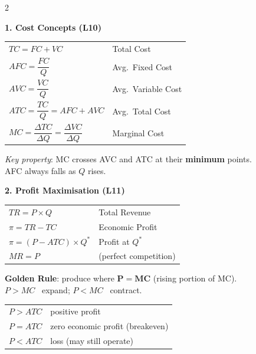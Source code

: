 \documentclass[9pt]{article}
\begin{document}
\begin{multicols}{2}

\begin{bluebox}
\textbf{\color{micro_blue}1. Cost Concepts (L10)}

\smallskip
\begin{tabular}{@{}ll@{}}
$TC = FC + VC$ & Total Cost \\[2pt]
$AFC = \dfrac{FC}{Q}$ & Avg.\ Fixed Cost \\[6pt]
$AVC = \dfrac{VC}{Q}$ & Avg.\ Variable Cost \\[6pt]
$ATC = \dfrac{TC}{Q} = AFC + AVC$ & Avg.\ Total Cost \\[6pt]
$MC = \dfrac{\Delta TC}{\Delta Q} = \dfrac{\Delta VC}{\Delta Q}$ & Marginal Cost \\[4pt]
\end{tabular}

\smallskip
\textit{Key property}: MC crosses AVC and ATC at their \textbf{minimum} points.\\
AFC always falls as $Q$ rises.
\end{bluebox}

\begin{bluebox}
\textbf{\color{micro_blue}2. Profit Maximisation (L11)}

\smallskip
\begin{tabular}{@{}ll@{}}
$TR = P \times Q$ & Total Revenue \\[3pt]
$\pi = TR - TC$ & Economic Profit \\[3pt]
$\pi = (P - ATC) \times Q^*$ & Profit at $Q^*$ \\[3pt]
$MR = P$ & (perfect competition) \\[3pt]
\end{tabular}

\smallskip
\textbf{Golden Rule}: produce where $\boldsymbol{P = MC}$ (rising portion of MC).\\
$P > MC$ \textrightarrow\ expand; \quad $P < MC$ \textrightarrow\ contract.

\smallskip
\begin{tabular}{@{}ll@{}}
$P > ATC$ & positive profit \\[2pt]
$P = ATC$ & zero economic profit (breakeven) \\[2pt]
$P < ATC$ & loss (may still operate) \\[2pt]
\end{tabular}
\end{bluebox}


\end{multicols}
\end{document}
